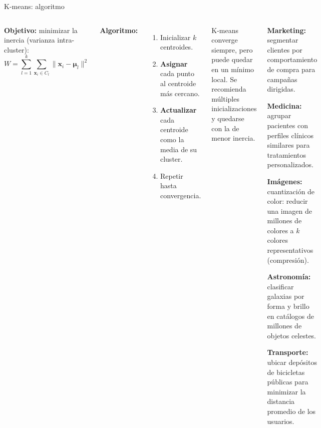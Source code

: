 \documentclass[aspectratio=169]{beamer}
\begin{document}
\begin{frame}{K-means: algoritmo}
\begin{columns}[T]
\textbf{Objetivo:} minimizar la inercia (varianza intra-cluster):
\[
W = \sum_{l=1}^{k}\sum_{\mathbf{x}_i \in C_l} \|\mathbf{x}_i - \boldsymbol{\mu}_l\|^2
\]

\medskip
\textbf{Algoritmo:}
\begin{enumerate}
  \item Inicializar $k$ centroides.
  \item \textbf{Asignar} cada punto al centroide más cercano.
  \item \textbf{Actualizar} cada centroide como la media de su cluster.
  \item Repetir hasta convergencia.
\end{enumerate}

\medskip
\begin{concepto}
K-means converge siempre, pero puede quedar en un mínimo local. Se recomienda múltiples inicializaciones y quedarse con la de menor inercia.
\end{concepto}

\begin{aplicacion}
\textbf{Marketing:} segmentar clientes por comportamiento de compra para campañas dirigidas.

\medskip
\textbf{Medicina:} agrupar pacientes con perfiles clínicos similares para tratamientos personalizados.

\medskip
\textbf{Imágenes:} cuantización de color: reducir una imagen de millones de colores a $k$ colores representativos (compresión).

\medskip
\textbf{Astronomía:} clasificar galaxias por forma y brillo en catálogos de millones de objetos celestes.

\medskip
\textbf{Transporte:} ubicar depósitos de bicicletas públicas para minimizar la distancia promedio de los usuarios.
\end{aplicacion}
\end{columns}
\end{frame}
\end{document}
